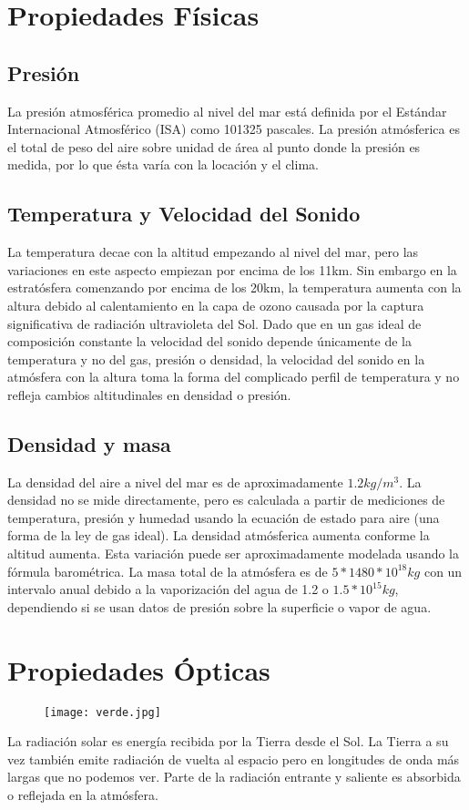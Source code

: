 \documentclass{article}
\begin{document}
\section{Propiedades Físicas}
\subsection{Presión}
La presión atmosférica promedio al nivel del mar está definida por el Estándar Internacional Atmosférico (ISA) como 101325 pascales. La presión atmósferica es el total de peso del aire sobre unidad de área al punto donde la presión es medida, por lo que ésta varía con la locación y el clima.
\subsection{Temperatura y Velocidad del Sonido}
La temperatura decae con la altitud empezando al nivel del mar, pero las variaciones en este aspecto empiezan por encima de los 11km. Sin embargo en la estratósfera comenzando por encima de los 20km, la temperatura aumenta con la altura debido al calentamiento en la capa de ozono causada por la captura significativa de radiación ultravioleta del Sol.
Dado que en un gas ideal de composición constante la velocidad del sonido depende únicamente de la temperatura y no del gas, presión o densidad, la velocidad del sonido en la atmósfera con la altura toma la forma del complicado perfil de temperatura y no refleja cambios altitudinales en densidad o presión.
\subsection{Densidad y masa}
La densidad del aire a nivel del mar es de aproximadamente $1.2kg/m^{3}$. La densidad no se mide directamente, pero es calculada a partir de mediciones de temperatura, presión y humedad usando la ecuación de estado para aire (una forma de la ley de gas ideal). La densidad atmósferica aumenta conforme la altitud aumenta. Esta variación puede ser aproximadamente modelada usando la fórmula barométrica. 
La masa total de la atmósfera es de $5*1480*10^{18}kg$ con un intervalo anual debido a la vaporización del agua de 1.2 o $1.5*10^{15}kg$, dependiendo si se usan datos de presión sobre la superficie o vapor de agua.
\section{Propiedades Ópticas}
\begin{figure}[h!]
\texttt{[image: verde.jpg]}
\end{figure}
La radiación solar es energía recibida por la Tierra desde el Sol. La Tierra a su vez también emite radiación de vuelta al espacio pero en longitudes de onda más largas que no podemos ver. Parte de la radiación entrante y saliente es absorbida o reflejada en la atmósfera.
\end{document}

